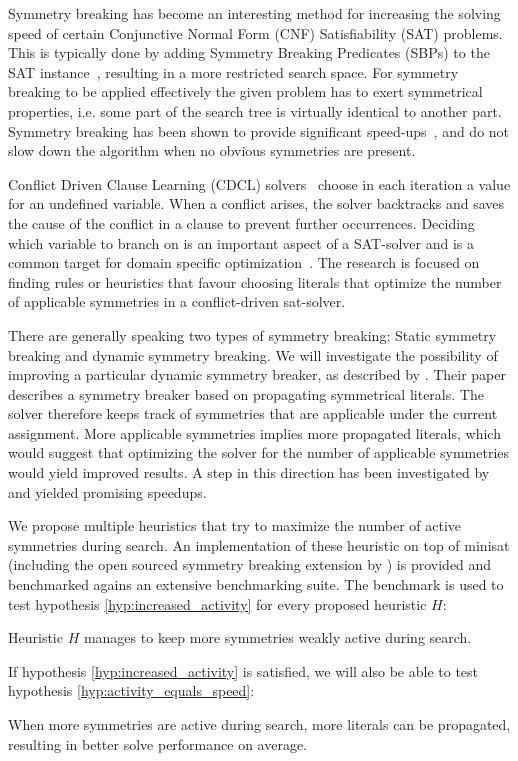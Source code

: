 Symmetry breaking has become an interesting method for increasing the solving speed of
certain Conjunctive Normal Form (CNF) Satisfiability (SAT) problems.
This is typically done by adding Symmetry Breaking Predicates (SBPs) to the SAT
instance~\cite{sakallah2009symmetry}, resulting in a more restricted search space.
For symmetry breaking to be applied effectively the given problem has to exert symmetrical
properties, i.e. some part of the search tree is virtually identical to another part.
Symmetry breaking has been shown to provide significant
speed-ups~\cite{darga2004exploiting,aloul2003solving}, and do not slow down the algorithm
when no obvious symmetries are present.

Conflict Driven Clause Learning (CDCL) solvers~\cite{marques1999grasp} choose in each iteration a value for an undefined variable.
When a conflict arises, the solver backtracks
and saves the cause of the conflict in a clause to prevent further occurrences.
Deciding which variable to branch on is an important aspect of a SAT-solver and is a common target
for domain specific optimization~\cite{een2004extensible}.
The research is focused on finding rules or heuristics that favour choosing literals
that optimize the number of applicable symmetries in a conflict-driven sat-solver.

There are generally speaking two types of symmetry breaking: Static symmetry breaking and
dynamic symmetry breaking.
We will investigate the possibility of improving a particular dynamic symmetry breaker, as described
by \cite{devriendt2012symmetry}.
Their paper describes a symmetry breaker based on propagating symmetrical literals.
The solver therefore keeps track of symmetries that are applicable under the current assignment.
More applicable symmetries implies more propagated literals, which would suggest that
optimizing the solver for the number of applicable symmetries would yield improved results.
A step in this direction has been investigated by \cite{devriendt2012symmetry} and yielded
promising speedups.

We propose multiple heuristics that try to maximize the number of active symmetries during
search.
An implementation of these heuristic on top of minisat (including the open sourced symmetry breaking
extension by \cite{devriendt2012symmetry}) is provided and benchmarked agains an extensive
benchmarking suite.
The benchmark is used to test hypothesis \ref{hyp:increased_activity} for every proposed heuristic
$H$:

\begin{hypothesis}
\label{hyp:increased_activity}
	Heuristic $H$ manages to keep more symmetries weakly active during search.
\end{hypothesis}

If hypothesis \ref{hyp:increased_activity} is satisfied, we will also be able to test
hypothesis \ref{hyp:activity_equals_speed}:

\begin{hypothesis}
\label{hyp:activity_equals_speed}
	When more symmetries are active during search, more literals can be propagated, resulting in
	better solve performance on average.
\end{hypothesis}

